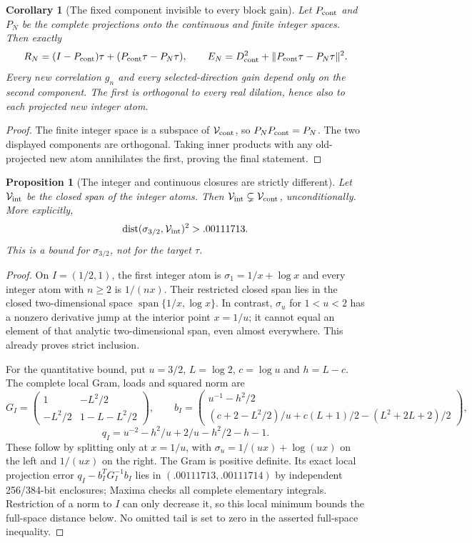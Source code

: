 \documentclass[11pt]{article}
\newtheorem{proposition}[theorem]{Proposition}
\newtheorem{corollary}[theorem]{Corollary}
\theoremstyle{remark}
\begin{document}
\begin{corollary}[The fixed component invisible to every block gain]
\label{cor:ns76-invisible-component}
Let $P_{\rm cont}$ and $P_N$ be the complete projections onto the
continuous and finite integer spaces. Then exactly
\[
 R_N=(I-P_{\rm cont})\tau+(P_{\rm cont}\tau-P_N\tau),
 \qquad
 E_N=D_{\rm cont}^2+\|P_{\rm cont}\tau-P_N\tau\|^2.
\]
Every new correlation $g_n$ and every selected-direction gain depend
only on the second component. The first is orthogonal to every real
dilation, hence also to each projected new integer atom.
\end{corollary}
\begin{proof}
The finite integer space is a subspace of $\mathcal V_{\rm cont}$,
so $P_NP_{\rm cont}=P_N$. The two displayed components are
orthogonal. Taking inner products with any old-projected new atom
annihilates the first, proving the final statement.
\end{proof}

\begin{proposition}[The integer and continuous closures are strictly different]
\label{prop:ns76-strict-closure}
Let $\mathcal V_{\rm int}$ be the closed span of the integer atoms.
Then $\mathcal V_{\rm int}\subsetneq\mathcal V_{\rm cont}$,
unconditionally. More explicitly,
\[
 \operatorname{dist}(\sigma_{3/2},\mathcal V_{\rm int})^2>.00111713.
\]
This is a bound for $\sigma_{3/2}$, not for the target $\tau$.
\end{proposition}
\begin{proof}
On $I=(1/2,1)$, the first integer atom is
$\sigma_1=1/x+\log x$ and every integer atom with $n\geq2$
is $1/(nx)$. Their restricted closed span lies in the closed
two-dimensional space $\operatorname{span}\{1/x,\log x\}$.
In contrast, $\sigma_u$ for $1<u<2$ has a nonzero derivative jump
at the interior point $x=1/u$; it cannot equal an element of that
analytic two-dimensional span, even almost everywhere. This already
proves strict inclusion.

For the quantitative bound, put $u=3/2$, $L=\log2$, $c=\log u$ and
$h=L-c$. The complete local Gram, loads and squared norm are
\[
 G_I=\begin{pmatrix}1&-L^2/2\\-L^2/2&1-L-L^2/2\end{pmatrix},\qquad
 b_I=\begin{pmatrix}
 u^{-1}-h^2/2\\
 (c+2-L^2/2)/u+c(L+1)/2-(L^2+2L+2)/2
 \end{pmatrix},
\]
\[
 q_I=u^{-2}-h^2/u+2/u-h^2/2-h-1.
\]
These follow by splitting only at $x=1/u$, with
$\sigma_u=1/(ux)+\log(ux)$ on the left and $1/(ux)$ on the right.
The Gram is positive definite. Its exact local projection error
$q_I-b_I^TG_I^{-1}b_I$ lies in $(.00111713,.00111714)$ by independent
256/384-bit enclosures; Maxima checks all complete elementary integrals.
Restriction of a norm to $I$ can only decrease it, so this local
minimum bounds the full-space distance below. No omitted tail is
set to zero in the asserted full-space inequality.
\end{proof}
\end{document}
